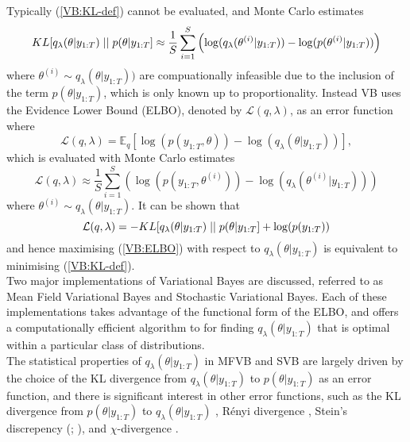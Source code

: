 \documentclass[
12pt, %
onehalfspacing, %
nohyperref, %
headsepline, %
chapterinoneline, %
]{MastersDoctoralThesis} %
\begin{document}
Typically (\ref{VB:KL-def}) cannot be evaluated, and Monte Carlo estimates
\begin{equation}
\label{VB:KL-MC}
KL[q_{\lambda}(\theta | y_{1:T})\hspace{.1cm}||\hspace{.1cm}p(\theta | y_{1:T}] \approx \frac{1}{S}\sum_{i=1}^S \left(\log(q_{\lambda}(\theta^{(i)} | y_{1:T})) - \log(p(\theta^{(i)} | y_{1:T})) \right)
\end{equation}
where $\theta^{(i)} \sim q_{\lambda}(\theta | y_{1:T}))$ are compuationally infeasible due to the inclusion of the term $p(\theta | y_{1:T})$, which is only known up to proportionality. Instead VB uses the Evidence Lower Bound (ELBO), denoted by $\mathcal{L}(q, \lambda)$, as an error function where
\begin{equation}
\label{VB:ELBO}
\mathcal{L}(q, \lambda) = \mathbb{E}_{q} \left[\log(p(y_{1:T}, \theta)) - \log(q_{\lambda}(\theta | y_{1:T}))\right],
\end{equation}
which is evaluated with Monte Carlo estimates
\begin{equation}
\label{VB:ELBO-MC}
\mathcal{L}(q, \lambda) \approx \frac{1}{S} \sum_{i=1}^S \left(\log(p(y_{1:T}, \theta^{(i)})) - \log(q_{\lambda}(\theta^{(i)} | y_{1:T})) \right)
\end{equation}
where $\theta^{(i)} \sim q_{\lambda}(\theta | y_{1:T})$. It can be shown that
\begin{equation}
\label{VB:ELBO-KL}
\mathcal{L}(q, \lambda) = - KL[q_{\lambda}(\theta | y_{1:T})\hspace{.1cm}||\hspace{.1cm}p(\theta | y_{1:T}] + \log(p(y_{1:T}))
\end{equation}
and hence maximising (\ref{VB:ELBO}) with respect to $q_{\lambda}(\theta | y_{1:T})$ is equivalent to minimising (\ref{VB:KL-def}).
\\

Two major implementations of Variational Bayes are discussed, referred to as Mean Field Variational Bayes and Stochastic Variational Bayes. Each of these implementations takes advantage of the functional form of the ELBO, and offers a computationally efficient algorithm to for finding $q_{\lambda}(\theta | y_{1:T})$ that is optimal within a particular class of distributions. 
\\

The statistical properties of $q_{\lambda}(\theta | y_{1:T})$ in MFVB and SVB are largely driven by the choice of the KL divergence from $q_{\lambda}(\theta | y_{1:T})$ to $p(\theta | y_{1:T})$ as an error function, and there is significant interest in other error functions, such as the KL divergence from $p(\theta | y_{1:T})$ to $q_{\lambda}(\theta | y_{1:T})$ \citep{Minka2001}, R\'enyi divergence \citep{Li2016}, Stein's discrepency (\citealp{Liu2016}; \citealp{Ranganath2016b}), and $\chi$-divergence \citep{Dieng2017}.
\end{document}
